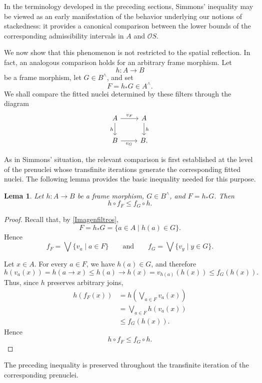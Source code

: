 \documentclass[11pt]{amsart}
\theoremstyle{plain}
\newtheorem{lem}[thm]{Lema}
\theoremstyle{definition}
\begin{document}
In the terminology developed in the preceding sections, Simmons'
inequality may be viewed as an early manifestation of the behavior
underlying our notions of stackedness: it provides a canonical
comparison between the lower bounds of the corresponding
admissibility intervals in \(A\) and \(\mathcal{O}S\).

We now show that this phenomenon is not restricted to the spatial
reflection. In fact, an analogous comparison holds for an arbitrary
frame morphism. Let
\[
    h\colon A\longrightarrow B
\]
be a frame morphism, let \(G\in B^\wedge\), and set
\[
    F=h_*G\in A^\wedge.
\]
We shall compare the fitted nuclei determined by these filters through
the diagram
\[
\begin{tikzcd}
    A \arrow[r,"v_F"] \arrow[d,"h"'] &
    A \arrow[d,"h"] \\
    B \arrow[r,"v_G"'] &
    B .
\end{tikzcd}
\]

As in Simmons' situation, the relevant comparison is first established
at the level of the prenuclei whose transfinite iterations generate the
corresponding fitted nuclei. The following lemma provides the basic
inequality needed for this purpose.

\begin{lem}\label{f1f}
Let \(h\colon A\to B\) be a frame morphism, \(G\in B^\wedge\), and
\(F=h_*G\). Then
\[
    h\circ f_F\leq f_G\circ h.
\]
\end{lem}

\begin{proof}
Recall that, by \eqref{Imagenfiltros},
\[
    F=h_*G=\{a\in A\mid h(a)\in G\}.
\]
Hence
\[
    f_F=\bigvee\{v_a\mid a\in F\}
    \qquad\text{and}\qquad
    f_G=\bigvee\{v_y\mid y\in G\}.
\]

Let \(x\in A\). For every \(a\in F\), we have \(h(a)\in G\), and
therefore
\[
    h(v_a(x))
    =h(a\to x)
    \leq h(a)\to h(x)
    =v_{h(a)}(h(x))
    \leq f_G(h(x)).
\]
Thus, since \(h\) preserves arbitrary joins,
\[
\begin{aligned}
    h(f_F(x))
    &=
    h\left(\bigvee_{a\in F}v_a(x)\right)\\
    &=
    \bigvee_{a\in F}h(v_a(x))\\
    &\leq f_G(h(x)).
\end{aligned}
\]
Hence
\[
    h\circ f_F\leq f_G\circ h.
\]
\end{proof}


The preceding inequality is preserved throughout the transfinite
iteration of the corresponding prenuclei.
\end{document}
